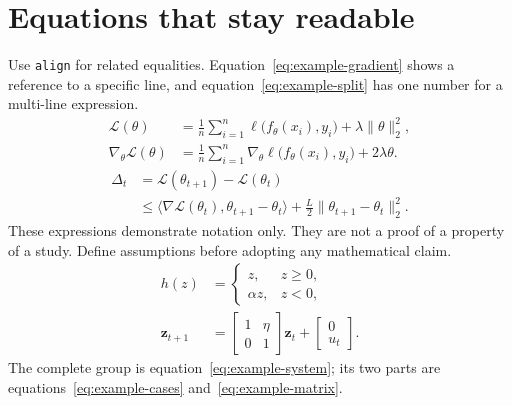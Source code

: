 \documentclass[11pt,a4paper]{article}
\begin{document}
\section{Equations that stay readable}
Use \texttt{align} for related equalities. Equation~\eqref{eq:example-gradient}
shows a reference to a specific line, and equation~\eqref{eq:example-split}
has one number for a multi-line expression.
\begin{align}
  \mathcal{L}(\theta) &= \frac{1}{n}\sum_{i=1}^{n}
    \ell\bigl(f_\theta(x_i),y_i\bigr)+\lambda\lVert\theta\rVert_2^2,
    \label{eq:example-loss}\\
  \nabla_\theta\mathcal{L}(\theta) &= \frac{1}{n}\sum_{i=1}^{n}
    \nabla_\theta\ell\bigl(f_\theta(x_i),y_i\bigr)+2\lambda\theta.
    \label{eq:example-gradient}
\end{align}
\begin{equation}
\begin{split}
  \Delta_t &= \mathcal{L}(\theta_{t+1})-\mathcal{L}(\theta_t)\\
  &\leq \langle\nabla\mathcal{L}(\theta_t),\theta_{t+1}-\theta_t\rangle
    +\frac{L}{2}\lVert\theta_{t+1}-\theta_t\rVert_2^2.
\end{split}\label{eq:example-split}
\end{equation}
These expressions demonstrate notation only. They are not a proof of a
property of a study. Define assumptions before adopting any mathematical claim.
\begin{subequations}\label{eq:example-system}
\begin{align}
 h(z)&=\begin{cases}z,&z\geq0,\\\alpha z,&z<0,\end{cases}
   \label{eq:example-cases}\\
 \mathbf{z}_{t+1}&=\begin{bmatrix}1&\eta\\0&1\end{bmatrix}\mathbf{z}_t
   +\begin{bmatrix}0\\u_t\end{bmatrix}.
   \label{eq:example-matrix}
\end{align}
\end{subequations}
The complete group is equation~\eqref{eq:example-system}; its two parts are
equations~\eqref{eq:example-cases} and~\eqref{eq:example-matrix}.
\clearpage
\end{document}
